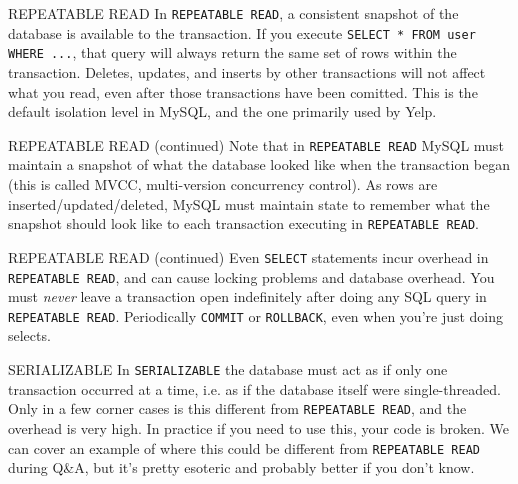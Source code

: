 \documentclass[14pt]{beamer}
\begin{document}
\begin{frame}{REPEATABLE READ}
  In \texttt{REPEATABLE READ}, a consistent snapshot of the database is
  available to the transaction. If you execute \texttt{SELECT * FROM user WHERE
    ...}, that query will always return the same set of rows within the
  transaction. Deletes, updates, and inserts by other transactions will not
  affect what you read, even after those transactions have been comitted.
  \newline
  \newline
  This is the default isolation level in MySQL, and the one primarily used by Yelp.
\end{frame}

\begin{frame}{REPEATABLE READ (continued)}
  Note that in \texttt{REPEATABLE READ} MySQL must maintain a snapshot of what
  the database looked like when the transaction began (this is called
  MVCC, multi-version concurrency control).
  \newline
  \newline
  As rows are inserted/updated/deleted, MySQL must maintain state to remember
  what the snapshot should look like to each transaction executing in
  \texttt{REPEATABLE READ}.
\end{frame}

\begin{frame}{REPEATABLE READ (continued)}
  Even \texttt{SELECT} statements incur overhead in \texttt{REPEATABLE READ},
  and can cause locking problems and database overhead.
  \newline
  \newline
  You must \emph{never} leave a transaction open indefinitely after doing any
  SQL query in \texttt{REPEATABLE READ}. Periodically \texttt{COMMIT} or
  \texttt{ROLLBACK}, even when you're just doing selects.
\end{frame}

\begin{frame}{SERIALIZABLE}
  In \texttt{SERIALIZABLE} the database must act as if only one transaction
  occurred at a time, i.e. as if the database itself were single-threaded. Only
  in a few corner cases is this different from \texttt{REPEATABLE READ}, and the
  overhead is very high.
  \pause
  \newline
  \newline
  In practice if you need to use this, your code is broken. We can cover an
  example of where this could be different from \texttt{REPEATABLE READ} during
  Q\&A, but it's pretty esoteric and probably better if you don't know.
\end{frame}
\end{document}
